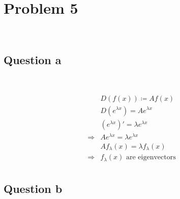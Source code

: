 \documentclass{article}
\begin{document}
\newpage

\section{Problem 5}

~

\subsection{Question a}

~

\begin{equation*}
    \begin{split}
        &D(f(x))\coloneqq Af(x)\\
        &D(e^{\lambda x})=Ae^{\lambda x}\\
        &(e^{\lambda x})'=\lambda e^{\lambda x}\\
        \Rightarrow &Ae^{\lambda x}=\lambda e^{\lambda x}\\
        &Af_\lambda(x)=\lambda f_\lambda(x)\\
        \Rightarrow& f_\lambda(x)\text{ are eigenvectors}\\
    \end{split}
\end{equation*}

\subsection{Question b}

~
\end{document}
